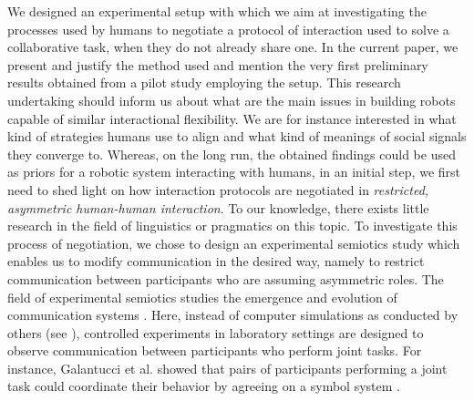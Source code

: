 {We designed an experimental setup with which we aim at investigating the processes used by humans to negotiate a protocol of interaction used to solve a collaborative task, when they do not already share one. In the current paper, we present and justify the method used and mention the very first preliminary results obtained from a pilot study employing the setup. This research undertaking should inform us about what are the main issues in building robots capable of similar interactional flexibility. We are for instance interested in what kind of strategies humans use to align and what kind of meanings of social signals they converge to. Whereas, on the long run, the obtained findings could be used as priors for a robotic system interacting with humans, in an initial step, we first need to shed light on how interaction protocols are negotiated in \emph{restricted, asymmetric human-human interaction}. To our knowledge, there exists little research in the field of linguistics or pragmatics on this topic. To investigate this process of negotiation, we chose to design an experimental semiotics study which enables us to modify communication in the desired way, namely to restrict communication between participants who are assuming asymmetric roles. The field of experimental semiotics studies the emergence and evolution of communication systems \cite{galantucci2009experimental}. Here, instead of computer simulations as conducted by others (see \cite{cangelosi2002simulating,steels2012experiments}), controlled experiments in laboratory settings are designed to observe communication between participants who perform joint tasks. For instance, Galantucci et al. showed that pairs of participants performing a joint task could coordinate their behavior by agreeing on a symbol system \cite{galantucci2005experimental}.


}
